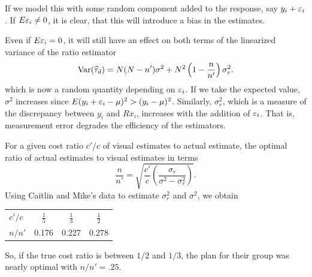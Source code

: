 \documentclass[usenames,dvipsnames]{homework}
\begin{document}
\begin{longproblem}
\begin{solution}
  If we model this with some random component added to the response, say $y_i + \varepsilon_i$. If $E\varepsilon_i \not=0$, it is clear, that this will introduce a bias in the estimates.

Even if $E\varepsilon_i = 0$, it will still have an effect on both terms of the linearized variance of the ratio estimator  
$$
\mathrm{Var}(\widehat\tau_d)  = N(N-n')\sigma^2 + N^2\left(1-\frac n{n'}\right)\sigma_r^2. 
$$
which is now a random quantity depending on $\varepsilon_i$. If we take the expected value, $\sigma^2$ increases since $E(y_i+\varepsilon_i - \mu)^2 > (y_i - \mu)^2$. Similarly, $\sigma_r^2$, which is a measure of the discrepancy between $y_i$ and $R x_i$, increases with the addition of $\varepsilon_i$.  That is, measurement error degrades the efficiency of the estimators.

\end{solution}


\begin{solution}
  For a given cost ratio $c'/c$ of visual estimates to actual estimate, the optimal ratio of actual estimates to visual estimates in terms  
  $$
  \frac{n}{n'} = \sqrt{\frac{c'}{c} \left(\frac{\sigma_r}{\sigma^2 - \sigma_r^2}\right)}.
  $$
  Using Caitlin and Mike's data to estimate $\sigma_r^2$ and $\sigma^2$, we obtain
\begin{center}
\renewcommand{\arraystretch}{1.6}
\begin{tabular}{l|c c c }
$c'/c$ &$\frac 15$&$\frac 13$&$\frac 12$\\
$n/n'$ & 0.176    & 0.227    &0.278     \\
\end{tabular}
\end{center}
So, if the true cost ratio is between $1/2$ and $1/3$, the plan for their group was nearly optimal with $n/n' = .25$.
\end{solution}
\end{longproblem}
\newpage
\end{document}
